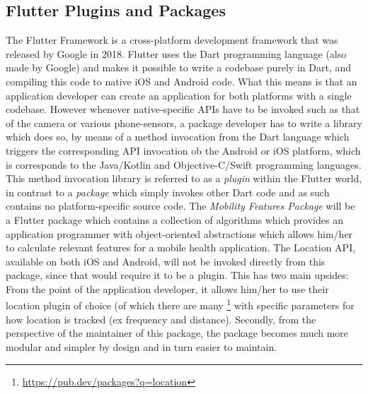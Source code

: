 \subsection{Flutter Plugins and Packages}
The Flutter Framework is a cross-platform development framework that was released by Google in 2018. Flutter uses the Dart programming language (also made by Google) and makes it possible to write a codebase purely in Dart, and compiling this code to native iOS and Android code. What this means is that an application developer can create an application for both platforms with a single codebase. However whenever native-specific APIs have to be invoked such as that of the camera or various phone-sensors, a package developer has to write a library which does so, by means of a method invocation from the Dart language which triggers the corresponding API invocation ob the Android or iOS platform, which is corresponds to the Java/Kotlin and Objective-C/Swift programming languages. This method invocation library is referred to as a \textit{plugin} within the Flutter world, in contrast to a \textit{package} which simply invokes other Dart code and as such contains no platform-specific source code. The \textit{Mobility Features Package} will be a Flutter package which contains a collection of algorithms which provides an application programmer with object-oriented abstractions which allows him/her to calculate relevant features for a mobile health application. The Location API, available on both iOS and Android, will not be invoked directly from this package, since that would require it to be a plugin. This has two main upsides: From the point of the application developer, it allows him/her to use their location plugin of choice (of which there are many \footnote{\url{https://pub.dev/packages?q=location}} with specific parameters for how location is tracked (ex frequency and distance). Secondly, from the perspective of the maintainer of this package, the package becomes much more modular and simpler by design and in turn easier to maintain.